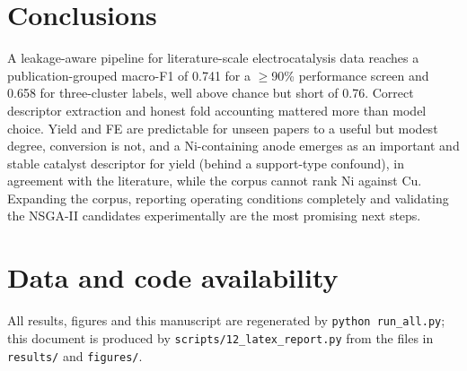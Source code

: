 \documentclass[11pt,a4paper]{article}
\begin{document}
\section{Conclusions}
A leakage-aware pipeline for literature-scale electrocatalysis data reaches a publication-grouped macro-F1 of 0.741 for a $\geq$90\% performance screen and 0.658 for three-cluster labels, well above chance but short of 0.76. Correct descriptor extraction and honest fold accounting mattered more than model choice. Yield and FE are predictable for unseen papers to a useful but modest degree, conversion is not, and a Ni-containing anode emerges as an important and stable catalyst descriptor for yield (behind a support-type confound), in agreement with the literature, while the corpus cannot rank Ni against Cu. Expanding the corpus, reporting operating conditions completely and validating the NSGA-II candidates experimentally are the most promising next steps.

\section*{Data and code availability}
All results, figures and this manuscript are regenerated by \texttt{python run\_all.py}; this
document is produced by \texttt{scripts/12\_latex\_report.py} from the files in
\texttt{results/} and \texttt{figures/}.
\end{document}
